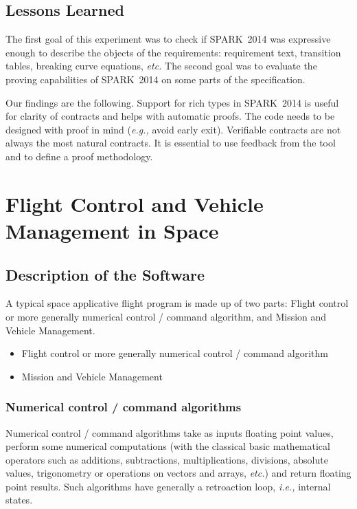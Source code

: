 \documentclass[10pt,a4paper,twocolumn]{article}
\newcommand{\newspark}{SPARK~2014\xspace}
\newcommand{\etc}{\textit{etc.}\xspace}
\newcommand{\ie}{\textit{i.e.,}\xspace}
\newcommand{\eg}{\textit{e.g.,}\xspace}
\begin{document}
\subsection{Lessons Learned}

The first goal of this experiment was to check if \newspark was expressive
enough to describe the objects of the requirements: requirement text,
transition tables, breaking curve equations, \etc The second goal was to
evaluate the proving capabilities of \newspark on some parts of the
specification.

Our findings are the following. Support for rich types in \newspark is useful
for clarity of contracts and helps with automatic proofs. The code needs to be
designed with proof in mind (\eg avoid early exit). Verifiable contracts are
not always the most natural contracts. It is essential to use feedback from the
tool and to define a proof methodology.

\section{Flight Control and Vehicle Management in Space}



\subsection{Description of the Software}

A typical space applicative flight program is made up of two parts:
\ifdefined\abstractonly
Flight control or more generally numerical control / command algorithm, and Mission and Vehicle Management.

\else

\begin{itemize}
\item Flight control or more generally numerical control / command algorithm
\item Mission and Vehicle Management
\end{itemize}
\fi

\subsubsection{Numerical control / command algorithms}

\ifdefined\abstractonly
\else
Numerical control / command algorithms take as inputs floating point values, perform some numerical computations (with the classical basic mathematical operators such as additions, subtractions, multiplications, divisions, absolute values, trigonometry or operations on vectors and arrays, \etc) and return floating point results. Such algorithms have generally a retroaction loop, \ie internal states.
\end{document}
